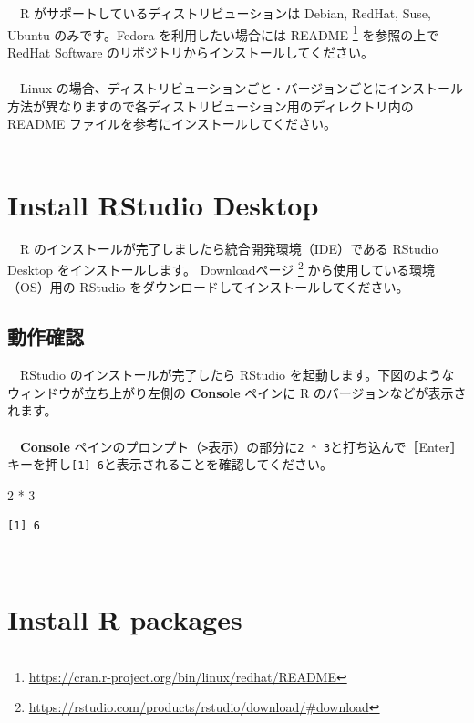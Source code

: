 \documentclass[
  12pt,
]{book}
\newenvironment{Shaded}{\begin{snugshade}}{\end{snugshade}}
\newcommand{\DecValTok}[1]{\textcolor[rgb]{0.00,0.00,0.81}{#1}}
\newcommand{\SpecialCharTok}[1]{\textcolor[rgb]{0.00,0.00,0.00}{#1}}
\DeclareRobustCommand{\href}[2]{#2\footnote{\url{#1}}}
\begin{document}
　R がサポートしているディストリビューションは Debian, RedHat, Suse, Ubuntu のみです。Fedora を利用したい場合には \href{https://cran.r-project.org/bin/linux/redhat/README}{README } を参照の上で RedHat Software のリポジトリからインストールしてください。\\
　\\
　Linux の場合、ディストリビューションごと・バージョンごとにインストール方法が異なりますので各ディストリビューション用のディレクトリ内の README ファイルを参考にインストールしてください。\\
　

\hypertarget{install-rstudio-desktop}{%
\section{Install RStudio Desktop}\label{install-rstudio-desktop}}

　R のインストールが完了しましたら統合開発環境（IDE）である RStudio Desktop をインストールします。 \href{https://rstudio.com/products/rstudio/download/\#download}{Downloadページ } から使用している環境（OS）用の RStudio をダウンロードしてインストールしてください。 　

\hypertarget{ux52d5ux4f5cux78baux8a8d}{%
\subsection{動作確認}\label{ux52d5ux4f5cux78baux8a8d}}

　RStudio のインストールが完了したら RStudio を起動します。下図のようなウィンドウが立ち上がり左側の \textbf{Console} ペインに R のバージョンなどが表示されます。\\
　\\

　\textbf{Console} ペインのプロンプト（\texttt{\textgreater{}}表示）の部分に\texttt{2\ *\ 3}と打ち込んで［Enter］キーを押し\texttt{{[}1{]}\ 6}と表示されることを確認してください。

\begin{Shaded}
\begin{Highlighting}[numbers=left,,]
\DecValTok{2} \SpecialCharTok{*} \DecValTok{3}
\end{Highlighting}
\end{Shaded}

\begin{verbatim}
[1] 6
\end{verbatim}

　

\hypertarget{install-r-packages}{%
\section{Install R packages}\label{install-r-packages}}
\end{document}
